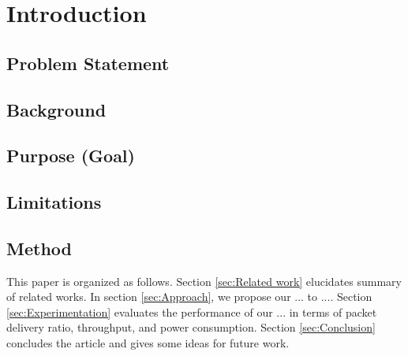 \section{Introduction} \label{sec:Introduction}

\subsection{Problem Statement}

\subsection{Background}

\subsection{Purpose (Goal)}

\subsection{Limitations}

\subsection{Method}


This paper is organized as follows.
Section \ref{sec:Related work} elucidates summary of related works.
In section \ref{sec:Approach}, we propose our ... to ....
Section \ref{sec:Experimentation} evaluates the performance of our ... in terms of packet delivery ratio,
	throughput,
	and power consumption.
Section \ref{sec:Conclusion} concludes the article and gives some ideas for future work.
